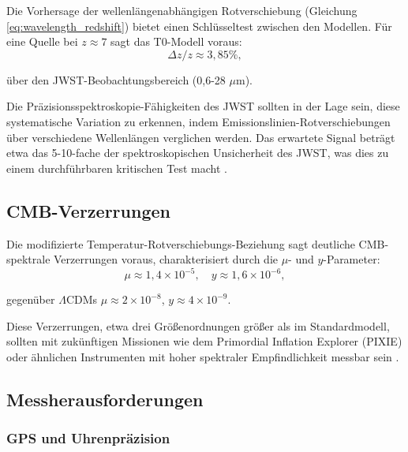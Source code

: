 \documentclass[12pt,a4paper]{article}
\newcommand{\LCDM}{\Lambda\text{CDM}}
\begin{document}
	Die Vorhersage der wellenlängenabhängigen Rotverschiebung (Gleichung \ref{eq:wavelength_redshift}) bietet einen Schlüsseltest zwischen den Modellen. Für eine Quelle bei \(z \approx 7\) sagt das T0-Modell voraus:
	\begin{equation}
		\Delta z / z \approx 3,85\%,
		\label{eq:redshift_variation_high_z}
	\end{equation}
	
	über den JWST-Beobachtungsbereich (0,6-28 \(\mu\text{m}\)).
	
	Die Präzisionsspektroskopie-Fähigkeiten des JWST sollten in der Lage sein, diese systematische Variation zu erkennen, indem Emissionslinien-Rotverschiebungen über verschiedene Wellenlängen verglichen werden. Das erwartete Signal beträgt etwa das 5-10-fache der spektroskopischen Unsicherheit des JWST, was dies zu einem durchführbaren kritischen Test macht \cite{pascher_params_2025}.
	
	\subsection{CMB-Verzerrungen}
	\label{subsec:cmb_distortions_test}
	
	Die modifizierte Temperatur-Rotverschiebungs-Beziehung sagt deutliche CMB-spektrale Verzerrungen voraus, charakterisiert durch die \(\mu\)- und \(y\)-Parameter:
	\begin{equation}
		\mu \approx 1,4 \times 10^{-5}, \quad y \approx 1,6 \times 10^{-6},
		\label{eq:distortion_parameters}
	\end{equation}
	
	gegenüber \(\LCDM\)s \(\mu \approx 2 \times 10^{-8}\), \(y \approx 4 \times 10^{-9}\).
	
	Diese Verzerrungen, etwa drei Größenordnungen größer als im Standardmodell, sollten mit zukünftigen Missionen wie dem Primordial Inflation Explorer (PIXIE) oder ähnlichen Instrumenten mit hoher spektraler Empfindlichkeit messbar sein \cite{pascher_temp_2025}.
	
	\subsection{Messherausforderungen}
	\label{subsec:measurement_challenges}
	
	\subsubsection{GPS und Uhrenpräzision}
	\label{subsec:gps_clock_problem}
	
\end{document}
